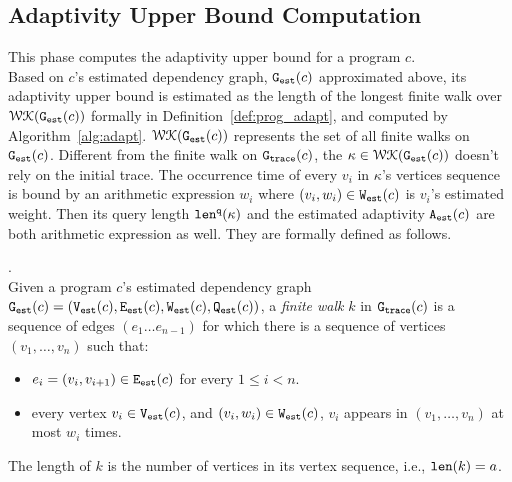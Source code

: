 \subsection{Adaptivity Upper Bound Computation}
\label{sec:alg_adaptcompute}
This phase computes the adaptivity upper bound for a program $c$.
\\
Based on
$c$'s estimated dependency graph, $\mathtt{{G_{est}}}({c})$ approximated above,
%
its adaptivity upper bound 
%
is estimated as
the length of the longest finite walk over $\mathcal{WK}(\mathtt{{G_{est}}}({c}))$ formally in Definition~\ref{def:prog_adapt}, 
and computed 
by Algorithm~\ref{alg:adapt}.
%
$\mathcal{WK}(\mathtt{{G_{est}}}(c))$ represents the set of all finite walks on
 $\mathtt{{G_{est}}}({c})$.
Different from the finite walk on $\mathtt{{G_{trace}}}(c)$, the $\kappa \in \mathcal{WK}(\mathtt{{G_{est}}}(c))$ doesn't rely on the initial trace.
The occurrence time of every $v_i$ in $\kappa$'s vertices sequence is bound by 
an arithmetic expression $w_i$ where $(v_i, w_i) \in \mathtt{{W_{est}}}(c)$ is $v_i$'s estimated weight.
Then its query length $\mathtt{len}^{\tt q}(\kappa)$ and the estimated adaptivity ${\mathtt{A_{est}}}(c)$ are both arithmetic expression as well.
%
They are formally defined as follows.
\begin{defn}.
  \label{def:prog_finitewalk}
  \\
  Given a program $c$'s estimated dependency graph 
  $\mathtt{{G_{est}}}({c}) = (\mathtt{{V_{est}}}(c), \mathtt{{E_{est}}}(c), \mathtt{{W_{est}}}(c), \mathtt{{Q_{est}}}(c))$, 
  a \emph{finite walk} $k$ in $\mathtt{{G_{trace}}}({c})$ is
  a sequence of edges $(e_1 \ldots e_{n - 1})$ 
  for which there is a sequence of vertices 
  $(v_1, \ldots, v_{n})$ such that:
  \begin{itemize}
      \item $e_i = (v_{i},v_{i + 1}) \in \mathtt{{E_{est}}}(c)$ for every $1 \leq i < n$.
      \item every vertex $v_i \in \mathtt{{V_{est}}}(c)$,
      and $(v_i, w_i) \in \mathtt{{W_{est}}}(c)$, 
       $v_i$ appears in $(v_1, \ldots, v_{n})$ at most 
    $w_i$
      times.  
  \end{itemize}
  The length of $k$ is the number of vertices in its vertex sequence, i.e., $\mathtt{len}(k) = a$.
 \end{defn}
